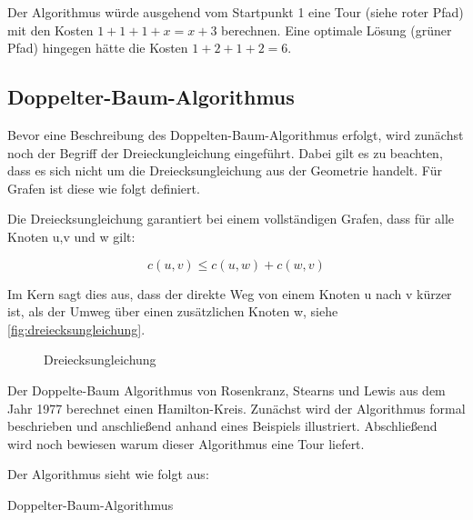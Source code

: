 \documentclass{article}
\begin{document}
Der Algorithmus würde ausgehend vom Startpunkt 1 eine Tour (siehe roter Pfad) mit den Kosten $1+1+1+x = x +3$ berechnen. Eine optimale Lösung (grüner Pfad) hingegen hätte die Kosten $1+2+1+2 = 6$.


\subsection{Doppelter-Baum-Algorithmus}

Bevor eine Beschreibung des Doppelten-Baum-Algorithmus erfolgt, wird zunächst noch der Begriff der Dreieckungleichung eingeführt. Dabei gilt es zu beachten, dass es sich nicht um die Dreiecksungleichung aus der Geometrie handelt. Für Grafen ist diese wie folgt definiert.

Die Dreiecksungleichung garantiert bei einem vollständigen Grafen, dass für alle Knoten u,v und w gilt:

\begin{equation}
c(u,v) \leq c(u,w) + c(w,v)
\end{equation}

Im Kern sagt dies aus, dass der direkte Weg von einem Knoten u nach v kürzer ist, als der Umweg über einen zusätzlichen Knoten w, siehe \autoref{fig:dreiecksungleichung}.

\begin{figure}[H]
\centering
{}
\caption{Dreiecksungleichung}
\label{fig:dreiecksungleichung}
\end{figure}

Der Doppelte-Baum Algorithmus von Rosenkranz, Stearns und Lewis aus dem Jahr 1977 berechnet einen Hamilton-Kreis. Zunächst wird der Algorithmus formal beschrieben und anschließend anhand eines Beispiels illustriert. Abschließend wird noch bewiesen warum dieser Algorithmus eine Tour liefert.

Der Algorithmus sieht wie folgt aus:

\begin{algorithm}
\caption{Doppelter-Baum-Algorithmus}
\end{algorithm}
\end{document}
